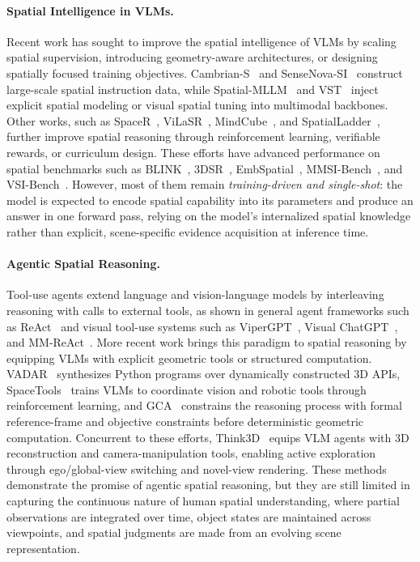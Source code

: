 \documentclass{llmxive}
\begin{document}
\label{sec:related}

\paragraph{Spatial Intelligence in VLMs.}
Recent work has sought to improve the spatial intelligence of VLMs by scaling spatial supervision, introducing geometry-aware architectures, or designing spatially focused training objectives. 
Cambrian-S~\citep{cambrian_s} and SenseNova-SI~\citep{sensenova_si} construct large-scale spatial instruction data, while Spatial-MLLM~\citep{spatial_mllm} and VST~\citep{vst} inject explicit spatial modeling or visual spatial tuning into multimodal backbones. 
Other works, such as SpaceR~\citep{spacer}, ViLaSR~\citep{vilasr}, MindCube~\citep{mindcube}, and SpatialLadder~\citep{spatialladder}, further improve spatial reasoning through reinforcement learning, verifiable rewards, or curriculum design. 
These efforts have advanced performance on spatial benchmarks such as BLINK~\citep{blink}, 3DSR~\citep{threedsr}, EmbSpatial~\citep{embspatial}, MMSI-Bench~\citep{mmsi_bench}, and VSI-Bench~\citep{vsi_bench}. 
However, most of them remain \textit{training-driven and single-shot}: the model is expected to encode spatial capability into its parameters and produce an answer in one forward pass, relying on the model's internalized spatial knowledge rather than explicit, scene-specific evidence acquisition at inference time.


\paragraph{Agentic Spatial Reasoning.}
Tool-use agents extend language and vision-language models by interleaving reasoning with calls to external tools, as shown in general agent frameworks such as ReAct~\citep{react} and visual tool-use systems such as ViperGPT~\citep{vipergpt}, Visual ChatGPT~\citep{visual_chatgpt}, and MM-ReAct~\citep{mm_react}. 
More recent work brings this paradigm to spatial reasoning by equipping VLMs with explicit geometric tools or structured computation. 
VADAR~\citep{vadar} synthesizes Python programs over dynamically constructed 3D APIs, SpaceTools~\citep{spacetools} trains VLMs to coordinate vision and robotic tools through reinforcement learning, and GCA~\citep{gca} constrains the reasoning process with formal reference-frame and objective constraints before deterministic geometric computation. 
Concurrent to these efforts, Think3D~\citep{zhang2026think3d} equips VLM agents with 3D reconstruction and camera-manipulation tools, enabling active exploration through ego/global-view switching and novel-view rendering. 
These methods demonstrate the promise of agentic spatial reasoning, but they are still limited in capturing the continuous nature of human spatial understanding, where partial observations are integrated over time, object states are maintained across viewpoints, and spatial judgments are made from an evolving scene representation.
\end{document}
